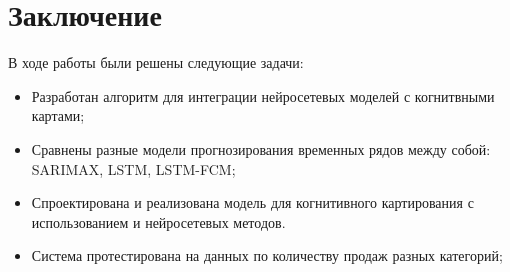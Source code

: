 \chapter*{Заключение}


В ходе работы были решены следующие задачи:

\begin{itemize}
	\item Разработан алгоритм для интеграции нейросетевых моделей с когнитвными картами;
	\item Сравнены разные модели прогнозирования временных рядов между собой: SARIMAX, LSTM, LSTM-FCM;
	\item Спроектирована и реализована модель для когнитивного картирования с использованием
	и нейросетевых методов.
	\item Система протестирована на данных по количеству продаж разных категорий;
\end{itemize}



